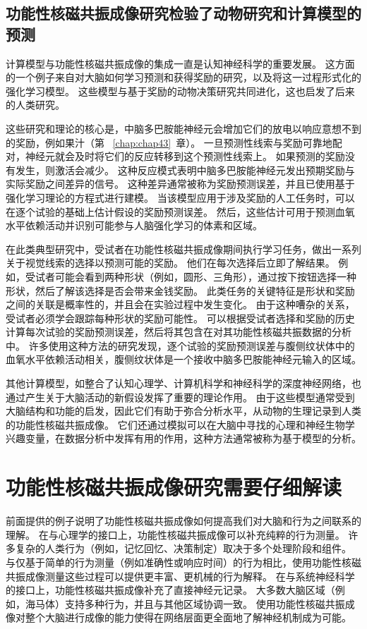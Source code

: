 \subsection{功能性核磁共振成像研究检验了动物研究和计算模型的预测}

计算模型与功能性核磁共振成像的集成一直是认知神经科学的重要发展。
这方面的一个例子来自对大脑如何学习预测和获得奖励的研究，以及将这一过程形式化的强化学习模型。
这些模型与基于奖励的动物决策研究共同进化，这也启发了后来的人类研究。


这些研究和理论的核心是，中脑多巴胺能神经元会增加它们的放电以响应意想不到的奖励，例如果汁（第 ~\ref{chap:chap43}~章）。 
一旦预测性线索与奖励可靠地配对，神经元就会及时将它们的反应转移到这个预测性线索上。
如果预测的奖励没有发生，则激活会减少。
这种反应模式表明中脑多巴胺能神经元发出预期奖励与实际奖励之间差异的信号。
这种差异通常被称为奖励预测误差，并且已使用基于强化学习理论的方程式进行建模。
当该模型应用于涉及奖励的人工任务时，可以在逐个试验的基础上估计假设的奖励预测误差。
然后，这些估计可用于预测血氧水平依赖活动并识别可能参与人脑强化学习的体素和区域。


在此类典型研究中，受试者在功能性核磁共振成像期间执行学习任务，做出一系列关于视觉线索的选择以预测可能的奖励。
他们在每次选择后立即了解结果。
例如，受试者可能会看到两种形状（例如，圆形、三角形），通过按下按钮选择一种形状，然后了解该选择是否会带来金钱奖励。
此类任务的关键特征是形状和奖励之间的关联是概率性的，并且会在实验过程中发生变化。
由于这种嘈杂的关系，受试者必须学会跟踪每种形状的奖励可能性。
可以根据受试者选择和奖励的历史计算每次试验的奖励预测误差，然后将其包含在对其功能性核磁共振数据的分析中。
许多使用这种方法的研究发现，逐个试验的奖励预测误差与腹侧纹状体中的血氧水平依赖活动相关，腹侧纹状体是一个接收中脑多巴胺能神经元输入的区域。


其他计算模型，如整合了认知心理学、计算机科学和神经科学的深度神经网络，也通过产生关于大脑活动的新假设发挥了重要的理论作用。
由于这些模型通常受到大脑结构和功能的启发，因此它们有助于弥合分析水平，从动物的生理记录到人类的功能性核磁共振成像。 
它们还通过模拟可以在大脑中寻找的心理和神经生物学兴趣变量，在数据分析中发挥有用的作用，这种方法通常被称为基于模型的分析。



\section{功能性核磁共振成像研究需要仔细解读}

前面提供的例子说明了功能性核磁共振成像如何提高我们对大脑和行为之间联系的理解。 
在与心理学的接口上，功能性核磁共振成像可以补充纯粹的行为测量。
许多复杂的人类行为（例如，记忆回忆、决策制定）取决于多个处理阶段和组件。
与仅基于简单的行为测量（例如准确性或响应时间）的行为相比，使用功能性核磁共振成像测量这些过程可以提供更丰富、更机械的行为解释。
在与系统神经科学的接口上，功能性核磁共振成像补充了直接神经元记录。
大多数大脑区域（例如，海马体）支持多种行为，并且与其他区域协调一致。
使用功能性核磁共振成像对整个大脑进行成像的能力使得在网络层面更全面地了解神经机制成为可能。


